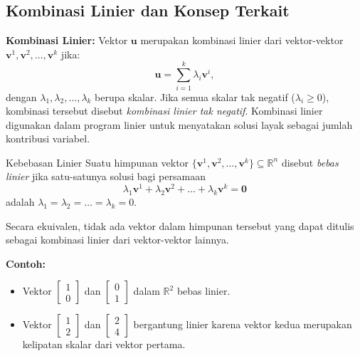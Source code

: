 \subsection{Kombinasi Linier dan Konsep Terkait}

\textbf{Kombinasi Linier:}  
Vektor \(\mathbf{u}\) merupakan kombinasi linier dari vektor-vektor \(\mathbf{v}^1, \mathbf{v}^2, \dots, \mathbf{v}^k\) jika:
\[
\mathbf{u} = \sum_{i=1}^k \lambda_i \mathbf{v}^i,
\]
dengan \(\lambda_1, \lambda_2, \dots, \lambda_k\) berupa skalar. Jika semua skalar tak negatif (\(\lambda_i \geq 0\)), kombinasi tersebut disebut \emph{kombinasi linier tak negatif}. Kombinasi linier digunakan dalam program linier untuk menyatakan solusi layak sebagai jumlah kontribusi variabel.

\begin{definition}{Kebebasan Linier}{}
Suatu himpunan vektor \( \{ \mathbf{v}^1, \mathbf{v}^2, \dots, \mathbf{v}^k \} \subseteq \mathbb{R}^n \) disebut \emph{bebas linier} jika satu-satunya solusi bagi persamaan
\[
\lambda_1 \mathbf{v}^1 + \lambda_2 \mathbf{v}^2 + \dots + \lambda_k \mathbf{v}^k = \mathbf{0}
\]
adalah \( \lambda_1 = \lambda_2 = \dots = \lambda_k = 0 \).  

Secara ekuivalen, tidak ada vektor dalam himpunan tersebut yang dapat ditulis sebagai kombinasi linier dari vektor-vektor lainnya.
\end{definition}

\textbf{Contoh:}
\begin{itemize}
    \item Vektor \( \begin{bmatrix}1\\0\end{bmatrix} \) dan \( \begin{bmatrix}0\\1\end{bmatrix} \) dalam \( \mathbb{R}^2 \) bebas linier.
    \item Vektor \( \begin{bmatrix}1\\2\end{bmatrix} \) dan \( \begin{bmatrix}2\\4\end{bmatrix} \) bergantung linier karena vektor kedua merupakan kelipatan skalar dari vektor pertama.
\end{itemize}

\vspace{1em}

